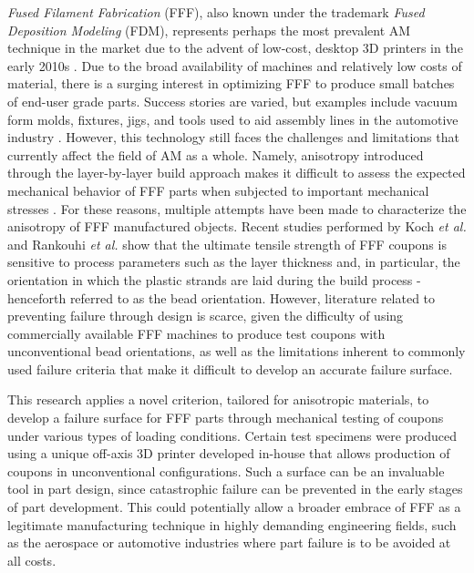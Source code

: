 \documentclass[main.tex]{subfiles}
\begin{document}
\emph{Fused Filament Fabrication} (FFF), also known under the trademark \emph{Fused Deposition Modeling} (FDM\texttrademark), represents perhaps the most prevalent AM technique in the market due to the advent of low-cost, desktop 3D printers in the early 2010s \cite{Capote2017}. Due to the broad availability of machines and relatively low costs of material, there is a surging interest in optimizing FFF to produce small batches of end-user grade parts. Success stories are varied, but examples include vacuum form molds, fixtures, jigs, and tools used to aid assembly lines in the automotive industry \cite{Hartman2014, VanHulle2017,deVries2017}. However, this technology still faces the challenges and limitations that currently affect the field of AM as a whole. Namely, anisotropy introduced through the layer-by-layer build approach makes it difficult to assess the expected mechanical behavior of FFF parts when subjected to important mechanical stresses \cite{Capote2017}. For these reasons, multiple attempts have been made to characterize the anisotropy of FFF manufactured objects. Recent studies performed by Koch \emph{et al.} \cite{Koch2017} and Rankouhi \emph{et al.} \cite{Rankouhi2016} show that the ultimate tensile strength of FFF coupons is sensitive to process parameters such as the layer thickness and, in particular, the orientation in which the plastic strands are laid during the build process -henceforth referred to as the bead orientation. However, literature related to preventing failure through design is scarce, given the difficulty of using commercially available FFF machines to produce test coupons with unconventional bead orientations, as well as the limitations inherent to commonly used failure criteria that make it difficult to develop an accurate failure surface.

This research applies a novel criterion, tailored for anisotropic materials, to develop a failure surface for FFF parts through mechanical testing of coupons under various types of loading conditions. Certain test specimens were produced using a unique off-axis 3D printer developed in-house that allows production of coupons in unconventional configurations. Such a surface can be an invaluable tool in part design, since catastrophic failure can be prevented in the early stages of part development. This could potentially allow a broader embrace of FFF as a legitimate manufacturing technique in highly demanding engineering fields, such as the aerospace or automotive industries where part failure is to be avoided at all costs.
\end{document}
